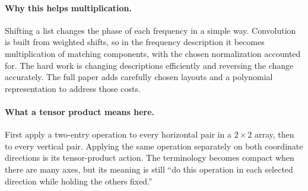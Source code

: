 \paragraph{Why this helps multiplication.}
Shifting a list changes the phase of each frequency in a simple way.
Convolution is built from weighted shifts, so in the frequency description
it becomes multiplication of matching components, with the chosen normalization
accounted for. The hard work is changing descriptions efficiently and reversing
the change accurately. The full paper adds carefully chosen layouts and a
polynomial representation to address those costs.

\paragraph{What a tensor product means here.}
First apply a two-entry operation to every horizontal pair in a $2\times2$
array, then to every vertical pair. Applying the same operation separately on
both coordinate directions is its tensor-product action. The terminology
becomes compact when there are many axes, but its meaning is still ``do this
operation in each selected direction while holding the others fixed.''

